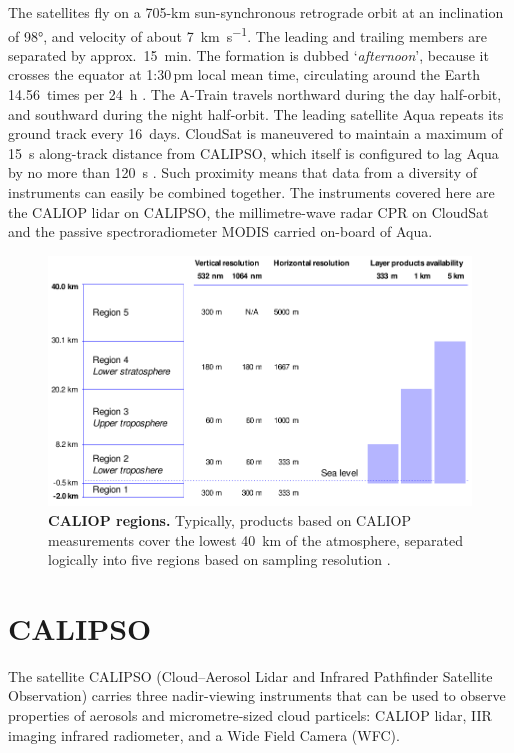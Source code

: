 The satellites fly on a 705-km sun-synchronous retrograde orbit at an
inclination of \ang{98},
and velocity of about \SI{7}{km.s^{-1}}.
The leading and trailing members are
separated by approx.~\SI{15}{min}. The formation is dubbed `\textit{afternoon}',
because it
crosses the
equator at 1:30\,pm local mean time, circulating around the Earth 14.56~times
per \SI{24}{h} \citep{CloudSatHandbook2008}. The A-Train travels northward
during the day half-orbit, and southward during the night half-orbit. The leading
satellite Aqua repeats its ground track every 16~days. CloudSat is
maneuvered to
maintain a maximum of \SI{15}{s} along-track distance from CALIPSO, which itself
is
configured to lag Aqua by no more than \SI{120}{s}
\citep{CALIPSO_CloudSat_GRACE_ScienceWritersGuide2005}. Such proximity means
that data from a diversity of
instruments can easily be combined together.
The instruments covered here are the CALIOP lidar on CALIPSO, the millimetre-wave radar CPR on
CloudSat and the passive spectroradiometer MODIS carried on-board of Aqua.

\begin{figure}[t]
\includegraphics[width=380pt]{images/caliop-regions.pdf}
\caption[CALIOP regions]{\textbf{CALIOP regions.}
Typically, products based on CALIOP measurements cover the lowest
\SI{40}{km} of the atmosphere, separated logically into five regions based on
sampling resolution \citep{Winker2004}.}
\label{fig:caliop-regions}
\end{figure}

\section{CALIPSO}
The satellite CALIPSO (Cloud–Aerosol Lidar and Infrared Pathfinder Satellite
Observation) carries three nadir-viewing instruments that can be used to observe
properties of aerosols and micrometre-sized cloud particels: CALIOP lidar, IIR
imaging infrared radiometer, and a Wide Field Camera (WFC).

